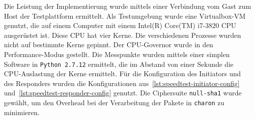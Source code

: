 Die Leistung der Implementierung wurde mittels einer Verbindung vom Gast zum Host der Testplattform ermittelt.
Als Testumgebung wurde eine Virtualbox-\ac{VM} genutzt, die auf einem Computer
mit einem Intel(R) Core(TM) i7-3820 CPU ausgerüstet ist. Diese \ac{CPU} hat vier Kerne.
Die verschiedenen Prozesse wurden nicht auf bestimmte Kerne gepinnt. Der \ac{CPU}-Governor
wurde in den Performance-Modus gestellt. Die Messpunkte
wurden mittels einer simplen Software in \texttt{Python 2.7.12} ermittelt, die im Abstand
von einer Sekunde die CPU-Auslastung der Kerne ermittelt. Für die Konfiguration des
Initiators und des Responders wurden die Konfigurationen aus~\autoref{lst:speedtest-initiator-config}
und~\autoref{lst:speedtest-responder-config} genutzt.
Die Ciphersuite \texttt{null-sha1} wurde gewählt, um den Overhead bei der Verarbeitung
der Pakete in \texttt{charon} zu minimieren.

